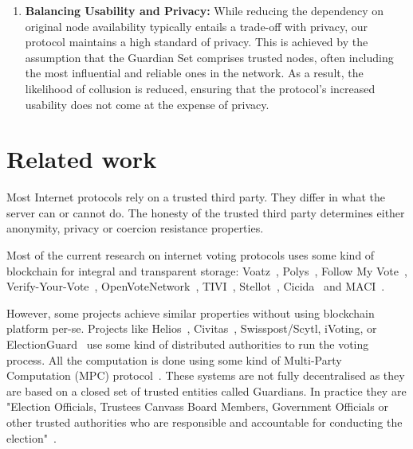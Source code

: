 \documentclass[runningheads]{llncs}
\begin{document}
\begin{enumerate}
    \item \textbf{Balancing Usability and Privacy:} While reducing the dependency on original node availability typically entails a trade-off with privacy, our protocol maintains a high standard of privacy. This is achieved by the assumption that the Guardian Set comprises trusted nodes, often including the most influential and reliable ones in the network. As a result, the likelihood of collusion is reduced, ensuring that the protocol's increased usability does not come at the expense of privacy.
    
\end{enumerate}

\section{Related work}

Most Internet protocols rely on a trusted third party. They differ in what the server can or cannot do. The honesty of the trusted third party determines either anonymity, privacy or coercion resistance properties.

Most of the current research on internet voting protocols uses some kind of blockchain for integral and transparent storage: 
Voatz~\cite{mooreWestVirginiaMobile2019}, 
Polys~\cite{PolysOnlineVoting}, Follow My Vote~\cite{SecureDecentralizedApplication2023}, Verify-Your-Vote~\cite{chaiebVerifyYourVoteVerifiableBlockchainBased2019},
OpenVoteNetwork~\cite{haoAnonymousVotingTworound2010,mccorrySmartContractBoardroom2017,seifelnasrScalableOpenVoteNetwork2020,elsheikhDisputefreeScalableOpen2022}, TIVI~\cite{TIVIPoweredSmartmatic,NowYouCan2016}, Stellot~\cite{baranskiPracticalIVotingStellar2020}, Cicida~\cite{BuildingCicadaPrivate,A16zCicada2023} and MACI~\cite{ethereumfoundationMinimalAntiCollusionInfrastructure2022,PrivacyscalingexplorationsMaci2023}.

However, some projects achieve similar properties without using blockchain platform per-se. Projects like Helios~\cite{adidaHeliosWebbasedOpenAudit2008}, Civitas~\cite{clarksonCivitasSecureVoting2008,roenneJCJImprovedVerifiability2016}, Swisspost/Scytl, iVoting, or ElectionGuard~\cite{ElectionGuard} use some kind of distributed authorities to run the voting process. All the computation is done using some kind of Multi-Party Computation (MPC) protocol~\cite{boweMultipartyProtocolConstructing2018}.
These systems are not fully decentralised as they are based on a closed set of trusted entities called Guardians. In practice they are "Election Officials, Trustees Canvass Board Members, Government Officials or other trusted authorities who are responsible and accountable for conducting the election"~\cite{ElectionGuardWhoGuardian}.
\end{document}
